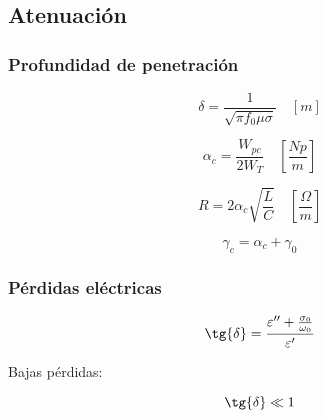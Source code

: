\documentclass[12pt,a4paper]{article}
\begin{document}
\subsection{Atenuación}
\label{sub:atenuacion}

\subsubsection{Profundidad de penetración}
\label{ssub:profundidad_de_penetracion}

\[ \delta = \frac{1}{\sqrt{\pi f_0 \mu \sigma}} \quad [m] \]

\[ \alpha_c = \frac{W_{pc}}{2 W_T} \quad \left[ \frac{Np}{m} \right] \]

\[ R = 2 \alpha_c \sqrt{\frac{L}{C}} \quad \left[ \frac{\Omega}{m} \right] \]

\[ \gamma_c = \alpha_c + \gamma_0 \]

\subsubsection{Pérdidas eléctricas}
\label{ssub:perdidas_electricas}

\[ \tg{\delta} = \frac{\varepsilon^{\prime\prime} + \frac{\sigma_0}{\omega_0}}{\varepsilon^{\prime}} \]

Bajas pérdidas:

\[ \tg{\delta} \ll 1 \]
\end{document}
